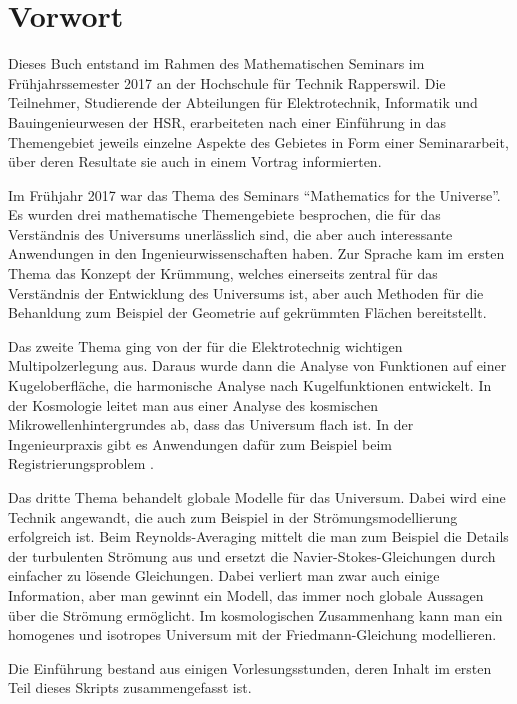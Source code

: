 %
%
%
\chapter*{Vorwort}
\rhead{}
Dieses Buch entstand im Rahmen des Mathematischen Seminars
im Frühjahrssemester 2017 an der Hochschule für Technik Rapperswil.
Die Teilnehmer, Studierende der Abteilungen für Elektrotechnik,
Informatik und Bauingenieurwesen der
HSR, erarbeiteten nach einer Einführung in das Themengebiet jeweils
einzelne Aspekte des Gebietes in Form einer Seminararbeit, über
deren Resultate sie auch in einem Vortrag informierten. 

Im Frühjahr 2017 war das Thema des Seminars ``Mathematics for
the Universe''.
Es wurden drei mathematische Themengebiete besprochen, die für
das Verständnis des Universums unerlässlich sind, die aber auch
interessante Anwendungen in den Ingenieurwissenschaften haben.
Zur Sprache kam im ersten Thema das Konzept der Krümmung,
welches einerseits zentral für das Verständnis der Entwicklung
des Universums ist, aber auch Methoden für die Behanldung 
zum Beispiel der Geometrie auf gekrümmten Flächen bereitstellt.

Das zweite Thema ging von der für die Elektrotechnig wichtigen
Multipolzerlegung aus.
Daraus wurde dann die Analyse von Funktionen auf einer Kugeloberfläche,
die harmonische Analyse nach Kugelfunktionen entwickelt.
In der Kosmologie leitet man aus einer Analyse des kosmischen
Mikrowellenhintergrundes ab, dass das Universum flach ist.
In der Ingenieurpraxis gibt es Anwendungen dafür zum Beispiel
beim Registrierungsproblem \cite{skript:tabea}.

Das dritte Thema behandelt globale Modelle für das Universum.
Dabei wird eine Technik angewandt, die auch zum Beispiel in der
Strömungsmodellierung erfolgreich ist.
Beim Reynolds-Averaging mittelt die man zum Beispiel die Details
der turbulenten Strömung aus und ersetzt die Navier-Stokes-Gleichungen
durch einfacher zu lösende Gleichungen.
Dabei verliert man zwar auch einige Information, aber man gewinnt
ein Modell, das immer noch globale Aussagen über die Strömung
ermöglicht.
Im kosmologischen Zusammenhang kann man ein homogenes und isotropes
Universum mit der Friedmann-Gleichung modellieren.

Die Einführung bestand aus einigen Vorlesungsstunden, deren
Inhalt im ersten Teil dieses Skripts zusammengefasst ist.  

